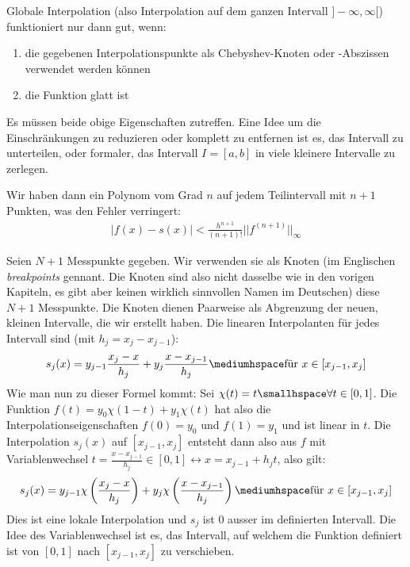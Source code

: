 Globale Interpolation (also Interpolation auf dem ganzen Intervall $]-\infty, \infty[$) funktioniert nur dann gut, wenn:
\rmvspace
\begin{enumerate}[label=(\alph*), noitemsep]
    \item die gegebenen Interpolationspunkte als Chebyshev-Knoten oder -Abszissen verwendet werden können
    \item die Funktion glatt ist
\end{enumerate}
Es müssen beide obige Eigenschaften zutreffen. 
Eine Idee um die Einschränkungen zu reduzieren oder komplett zu entfernen ist es, das Intervall zu unterteilen, oder formaler,
das Intervall $I = [a, b]$ in viele kleinere Intervalle zu zerlegen.

Wir haben dann ein Polynom vom Grad $n$ auf jedem Teilintervall mit $n + 1$ Punkten, was den Fehler verringert:
\begin{align*}
    |f(x) - s(x)| < \frac{h^{n + 1}}{(n + 1)!} ||f^{(n + 1)}||_{\infty}
\end{align*}

Seien $N + 1$ Messpunkte gegeben. Wir verwenden sie als Knoten 
(im Englischen \textit{breakpoints} gennant. Die Knoten sind also nicht dasselbe wie in den vorigen Kapiteln, es gibt aber keinen wirklich sinnvollen Namen im Deutschen)
diese $N + 1$ Messpunkte. Die Knoten dienen Paarweise als Abgrenzung der neuen, kleinen Intervalle, die wir erstellt haben. 
Die linearen Interpolanten für jedes Intervall sind (mit $h_j = x_j - x_{j - 1}$):
\begin{align*}
    s_j(x) = y_{j - 1}\frac{x_j - x}{h_j} + y_j \frac{x - x_{j - 1}}{h_j} \mediumhspace \text{für } x \in [x_{j - 1}, x_j]
\end{align*}
Wie man nun zu dieser Formel kommt:
Sei $\chi(t) = t \smallhspace \forall t \in [0, 1]$. 
Die Funktion $f(t) = y_0 \chi(1 - t) + y_1 \chi(t)$ hat also die Interpolationseigenschaften $f(0) = y_0$ und $f(1) = y_1$ und ist linear in $t$.
Die Interpolation $s_j(x)$ auf $[x_{j - 1}, x_j]$ entsteht dann also aus $f$ mit Variablenwechsel $t = \frac{x - x_{j - 1}}{h_j} \in [0, 1] \leftrightarrow x = x_{j - 1} + h_j t$,
also gilt:
\begin{align*}
    s_j(x) = y_{j - 1} \chi \left( \frac{x_j - x}{h_j} \right) + y_j \chi \left( \frac{x - x_{j - 1}}{h_j} \right) \mediumhspace \text{für } x \in [x_{j - 1}, x_j]
\end{align*}
Dies ist eine lokale Interpolation und $s_j$ ist $0$ ausser im definierten Intervall. 
Die Idee des Variablenwechsel ist es, das Intervall, auf welchem die Funktion definiert ist von $[0, 1]$ nach $[x_{j - 1}, x_j]$ zu verschieben.
